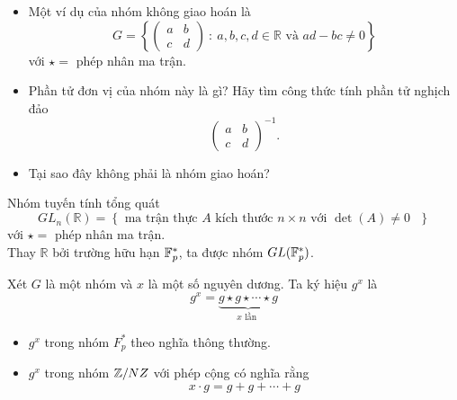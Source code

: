 \begin{frame}
	\begin{xmpl}
		\begin{itemize}
			\item<+-> Một ví dụ của nhóm không giao hoán là 
			$$
			G = \left\{ \begin{pmatrix}
				a & b\\
				c & d
			\end{pmatrix}\ :\ a,b,c,d \in \mathbb{R} \text{ và } ad - bc \not= 0 \right\}
			$$
			với $\star =$ phép nhân ma trận. 
			\item<+-> Phần tử đơn vị của nhóm này là gì? Hãy tìm công thức tính phần tử nghịch đảo 
			$$
			\begin{pmatrix}
							a & b\\
							c & d
						\end{pmatrix}^{-1}.
			$$
			
			\item<+-> Tại sao đây không phải là nhóm giao hoán?
		\end{itemize}
	\end{xmpl}
\end{frame}

\begin{frame}
	\begin{xmpl} Nhóm tuyến tính tổng quát 
			$$
			GL_n(\mathbb{R}) = \left\{ \text{ ma trận thực $A$ kích thước $n\times n$ với $\det(A)\not= 0$ } \right\}
			$$
			với $\star =$ phép nhân ma trận. \\
			
			\vspace{0.5cm}
			 Thay $\mathbb{R}$ bởi trường hữu hạn $\mathbb{F}_p^*$, ta được nhóm $GL(\mathbb{F}_p^*)$.
			
			
	\end{xmpl}
\end{frame}

\begin{frame}
	\begin{dfntn}
		Xét $G$ là một nhóm và $x$ là một số nguyên dương. Ta ký hiệu $g^x$ là 
		$$
		g^x = \underbrace{g\star g\star \cdots \star g}_{x \text{ lần }}
		$$
	\end{dfntn}
\end{frame}

\begin{frame}
	\begin{xmpl}
		\begin{itemize}
			\item<+-> $g^x$ trong nhóm $F_p^*$ theo nghĩa thông thường.
			\item<+-> $g^x$ trong nhóm $\mathbb{Z}/NZ$ với phép cộng có nghĩa rằng $$x \cdot g = g+g+\cdots +g$$ 
		\end{itemize}
	\end{xmpl}
\end{frame}


